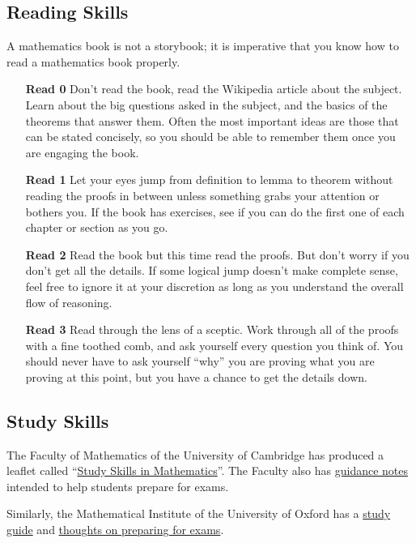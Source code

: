 \subsection*{Reading Skills}
A mathematics book is not a storybook; it is imperative that you know how to read a mathematics book properly.
\begin{enumerate}
\item[\textbf{Read 0}] Don't read the book, read the Wikipedia article about the subject. Learn about the big questions asked in the subject, and the basics of the theorems that answer them. Often the most important ideas are those that can be stated concisely, so you should be able to remember them once you are engaging the book.
\item[\textbf{Read 1}] Let your eyes jump from definition to lemma to theorem without reading the proofs in between unless something grabs your attention or bothers you. If the book has exercises, see if you can do the first one of each chapter or section as you go.
\item[\textbf{Read 2}] Read the book but this time read the proofs. But don't worry if you don't get all the details. If some logical jump doesn't make complete sense, feel free to ignore it at your discretion as long as you understand the overall flow of reasoning.
\item[\textbf{Read 3}] Read through the lens of a sceptic. Work through all of the proofs with a fine toothed comb, and ask yourself every question you think of. You should never have to ask yourself ``why'' you are proving what you are proving at this point, but you have a chance to get the details down.
\end{enumerate}

\subsection*{Study Skills}
The Faculty of Mathematics of the University of Cambridge has produced a leaflet called ``\href{https://www.maths.cam.ac.uk/undergrad/files/studyskills.pdf}{Study Skills in Mathematics}''. The Faculty also has \href{https://www.maths.cam.ac.uk/undergrad/files/Advice%20on%20Preparing%20for%20Exams%202022.pdf}{guidance notes} intended to help students prepare for exams.

Similarly, the Mathematical Institute of the University of Oxford has a \href{https://www.maths.ox.ac.uk/system/files/attachments/study_public_0.pdf}{study guide} and \href{https://www.maths.ox.ac.uk/system/files/attachments/Revision_advice_final_0.pdf}{thoughts on preparing for exams}.